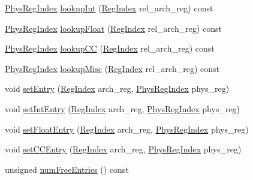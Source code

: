 \begin{DoxyCompactItemize}
\hyperlink{o3_2comm_8hh_a5ec29599c4bc29a3054c451674969e7b}{PhysRegIndex} \hyperlink{classUnifiedRenameMap_af15380c4147afeea6a1d9675a7210244}{lookupInt} (\hyperlink{classUnifiedRenameMap_a36d25e03e43fa3bb4c5482cbefe5e0fb}{RegIndex} rel\_\-arch\_\-reg) const 
\item 
\hyperlink{o3_2comm_8hh_a5ec29599c4bc29a3054c451674969e7b}{PhysRegIndex} \hyperlink{classUnifiedRenameMap_a356c0162075adeb1426a1f237da3825e}{lookupFloat} (\hyperlink{classUnifiedRenameMap_a36d25e03e43fa3bb4c5482cbefe5e0fb}{RegIndex} rel\_\-arch\_\-reg) const 
\item 
\hyperlink{o3_2comm_8hh_a5ec29599c4bc29a3054c451674969e7b}{PhysRegIndex} \hyperlink{classUnifiedRenameMap_a8ce66153601d299656186b221fc1b264}{lookupCC} (\hyperlink{classUnifiedRenameMap_a36d25e03e43fa3bb4c5482cbefe5e0fb}{RegIndex} rel\_\-arch\_\-reg) const 
\item 
\hyperlink{o3_2comm_8hh_a5ec29599c4bc29a3054c451674969e7b}{PhysRegIndex} \hyperlink{classUnifiedRenameMap_aa15bfaea32a01837167598470949c063}{lookupMisc} (\hyperlink{classUnifiedRenameMap_a36d25e03e43fa3bb4c5482cbefe5e0fb}{RegIndex} rel\_\-arch\_\-reg) const 
\item 
void \hyperlink{classUnifiedRenameMap_a5c6cad04be83122ff38650d859fbf1d8}{setEntry} (\hyperlink{classUnifiedRenameMap_a36d25e03e43fa3bb4c5482cbefe5e0fb}{RegIndex} arch\_\-reg, \hyperlink{o3_2comm_8hh_a5ec29599c4bc29a3054c451674969e7b}{PhysRegIndex} phys\_\-reg)
\item 
void \hyperlink{classUnifiedRenameMap_a1bd71f7635e3eba4028ce0e9e5f88552}{setIntEntry} (\hyperlink{classUnifiedRenameMap_a36d25e03e43fa3bb4c5482cbefe5e0fb}{RegIndex} arch\_\-reg, \hyperlink{o3_2comm_8hh_a5ec29599c4bc29a3054c451674969e7b}{PhysRegIndex} phys\_\-reg)
\item 
void \hyperlink{classUnifiedRenameMap_a86eefa45c1ed5ce515d2e8911b3d5a9a}{setFloatEntry} (\hyperlink{classUnifiedRenameMap_a36d25e03e43fa3bb4c5482cbefe5e0fb}{RegIndex} arch\_\-reg, \hyperlink{o3_2comm_8hh_a5ec29599c4bc29a3054c451674969e7b}{PhysRegIndex} phys\_\-reg)
\item 
void \hyperlink{classUnifiedRenameMap_a3d65458af1654ac17ee2ddf445858ba2}{setCCEntry} (\hyperlink{classUnifiedRenameMap_a36d25e03e43fa3bb4c5482cbefe5e0fb}{RegIndex} arch\_\-reg, \hyperlink{o3_2comm_8hh_a5ec29599c4bc29a3054c451674969e7b}{PhysRegIndex} phys\_\-reg)
\item 
unsigned \hyperlink{classUnifiedRenameMap_a1fb7464c57712609e9d9ca38aff7fc8e}{numFreeEntries} () const 
\end{DoxyCompactItemize}
